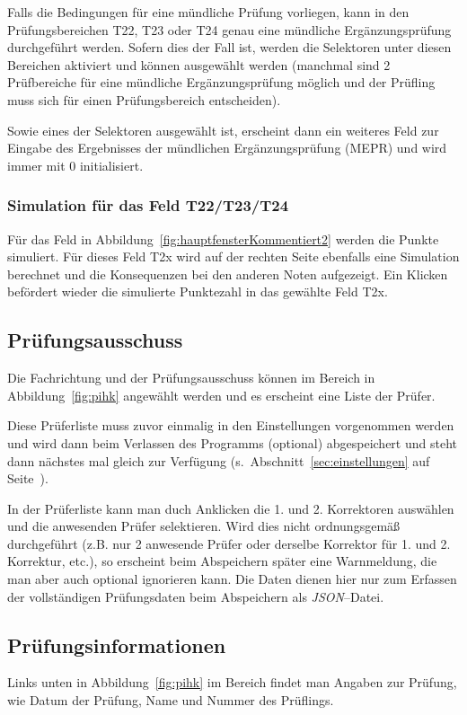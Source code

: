 \documentclass[a4paper,notitlepage,parskip=half]{scrartcl}
\newcommand*\circled[1]{\tikz[baseline=(char.base)]{
            \node[shape=circle,draw,inner sep=2pt] (char) {#1};}}
\begin{document}
Falls die Bedingungen für eine mündliche Prüfung vorliegen, kann in den Prüfungsbereichen T22, T23 oder T24 genau eine mündliche Ergänzungsprüfung durchgeführt werden. Sofern dies der Fall ist, werden die Selektoren unter diesen Bereichen aktiviert und können ausgewählt werden (manchmal sind 2 Prüfbereiche für eine mündliche Ergänzungsprüfung möglich und der Prüfling muss sich für einen Prüfungsbereich entscheiden).

Sowie eines der Selektoren ausgewählt ist, erscheint dann ein weiteres Feld zur Eingabe des Ergebnisses der mündlichen Ergänzungsprüfung (MEPR) und wird immer mit 0 initialisiert.

\subsubsection*{Simulation für das Feld T22/T23/T24}
Für das Feld \circled{2} in Abbildung~\ref{fig:hauptfensterKommentiert2} werden die Punkte simuliert.
Für dieses Feld T2x wird auf der rechten Seite ebenfalls eine Simulation berechnet und die Konsequenzen bei den anderen Noten aufgezeigt. Ein Klicken befördert wieder die simulierte Punktezahl in das gewählte Feld T2x.\marginnote{\textcolor{red}\warning}

\subsection{Prüfungsausschuss}
Die Fachrichtung und der Prüfungsausschuss können im Bereich \circled{C} in Abbildung~\ref{fig:pihk} angewählt werden und es erscheint eine Liste der Prüfer.

Diese Prüferliste muss zuvor einmalig in den Einstellungen vorgenommen werden und wird dann beim Verlassen des Programms (optional) abgespeichert und steht dann nächstes mal gleich zur Verfügung (s.~Abschnitt~\ref{sec:einstellungen} auf Seite~\pageref{sec:einstellungen}).

In der Prüferliste kann man duch Anklicken die 1. und 2. Korrektoren auswählen und die anwesenden Prüfer selektieren. Wird dies nicht ordnungsgemäß durchgeführt (z.B. nur 2 anwesende Prüfer oder derselbe Korrektor für 1. und 2. Korrektur, etc.), so erscheint beim Abspeichern später eine Warnmeldung, die man aber auch optional ignorieren kann. Die Daten dienen hier nur zum Erfassen der vollständigen Prüfungsdaten beim Abspeichern als \emph{JSON}--Datei. 

\subsection{Prüfungsinformationen}
Links unten in Abbildung~\ref{fig:pihk} im Bereich \circled{D} findet man Angaben zur Prüfung, wie Datum der Prüfung, Name und Nummer des Prüflings.
\end{document}
